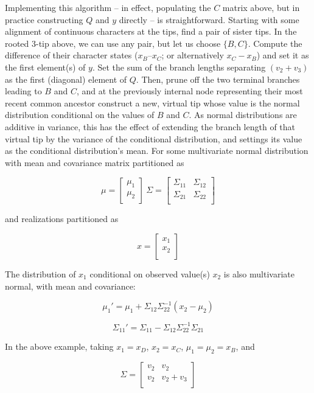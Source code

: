 Implementing this algorithm – in effect, populating the $C$ matrix above, but in practice constructing $Q$ and $y$ directly – is straightforward. Starting with some alignment of continuous characters at the tips, find a pair of sister tips. In the rooted 3-tip above, we can use any pair, but let us choose $\{B,C\}$. Compute the difference of their character states ($x_B – x_C$; or alternatively $x_C - x_B$) and set it as the first element(s) of $y$. Set the sum of the branch lengths separating $(v_2 + v_3)$ as the first (diagonal) element of $Q$. Then, prune off the two terminal branches leading to $B$ and $C$, and at the previously internal node representing their most recent common ancestor construct a new, virtual tip whose value is the normal distribution conditional on the values of $B$ and $C$. As normal distributions are additive in variance, this has the effect of extending the branch length of that virtual tip by the variance of the conditional distribution, and settings its value as the conditional distribution’s mean. For some multivariate normal distribution with mean and covariance matrix partitioned as

{\large\[\mu = \begin{bmatrix}
\mu_1 \\
\mu_2 \\
\end{bmatrix} \
\Sigma = \begin{bmatrix}
\Sigma_{11} & \Sigma_{12}\\
\Sigma_{21} & \Sigma_{22}\\
\end{bmatrix}
\]}

and realizations partitioned as

{\large\[x = \begin{bmatrix}
x_1 \\
x_2 \\
\end{bmatrix}\]}

The distribution of $x_1$ conditional on observed value(s) $x_2$ is also multivariate normal, with mean and covariance:

{\large\[\mu_1' = \mu_1 + \Sigma_{12}\Sigma_{22}^{-1}(x_2-\mu_2)\]}

{\large\[\Sigma_{11}' = \Sigma_{11} - \Sigma_{12}\Sigma_{22}^{-1}\Sigma_{21}\]}

In the above example, taking $x_1 = x_D$, $x_2 = x_C$, $\mu_1 = \mu_2 = x_B$, and

{\large\[\Sigma = \begin{bmatrix}
v_2 & v_2\\
v_2 & v_2+v_3\\
\end{bmatrix}\]}

